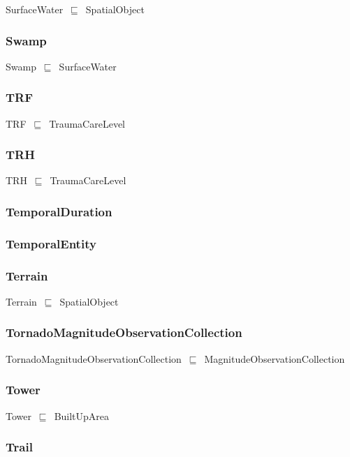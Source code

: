 \documentclass{article}
\begin{document}
SurfaceWater~\ensuremath{\sqsubseteq}~SpatialObject~

\subsubsection*{Swamp}

Swamp~\ensuremath{\sqsubseteq}~SurfaceWater~

\subsubsection*{TRF}

TRF~\ensuremath{\sqsubseteq}~TraumaCareLevel~

\subsubsection*{TRH}

TRH~\ensuremath{\sqsubseteq}~TraumaCareLevel~

\subsubsection*{TemporalDuration}

\subsubsection*{TemporalEntity}

\subsubsection*{Terrain}

Terrain~\ensuremath{\sqsubseteq}~SpatialObject~

\subsubsection*{TornadoMagnitudeObservationCollection}

TornadoMagnitudeObservationCollection~\ensuremath{\sqsubseteq}~MagnitudeObservationCollection~

\subsubsection*{Tower}

Tower~\ensuremath{\sqsubseteq}~BuiltUpArea~

\subsubsection*{Trail}
\end{document}
